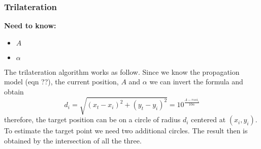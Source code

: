 \documentclass[12pt]{article}
\begin{document}
\subsubsection{Trilateration}

  \begin{center}
  \textbf{Need to know:}
  \begin{itemize}
    \centering
    \item $A$
    \item $\alpha$
  \end{itemize}
  \end{center}
The trilateration algorithm works as follow. Since we know the propagation model (eqn ??), the current position, $A$ and $\alpha$ we can invert the formula and obtain
\begin{equation}
    d_i=\sqrt{(x_t-x_i)^2+(y_t-y_i)^2}=10^{\frac{A-rssi_i}{10\alpha}}    
\end{equation}
therefore, the target position can be on a circle of radius $d_i$ centered at $(x_i,y_i)$. 
To estimate the target point we need two additional circles. The result then is obtained by the intersection of all the three.
\begin{center}
\end{center}
\end{document}
